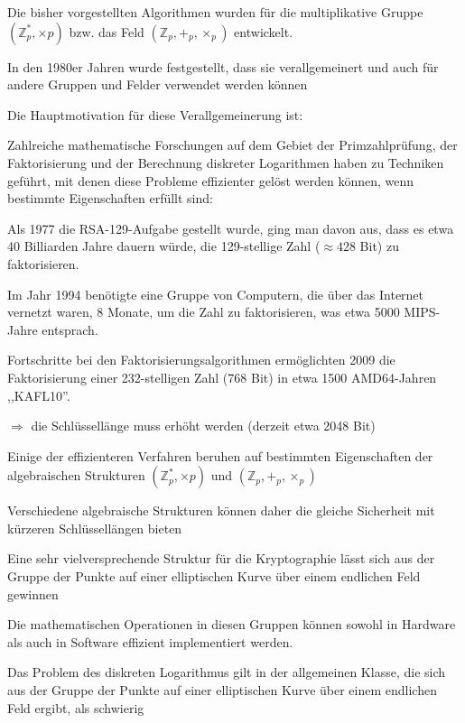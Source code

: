 \documentclass[a4paper]{article}
\begin{document}
\begin{multicols}{3}
      \begin{itemize*}
            \item Die bisher vorgestellten Algorithmen wurden für die multiplikative
            Gruppe $(\mathbb{Z}^*_p,\times p)$
            bzw. das Feld $(\mathbb{Z}_p, +_p,
                  \times_p)$ entwickelt.
            \item In den 1980er Jahren wurde festgestellt, dass sie verallgemeinert und
            auch für andere Gruppen und Felder verwendet werden können
            \item Die Hauptmotivation für diese Verallgemeinerung ist:
            \begin{itemize*}
                  \item Zahlreiche mathematische Forschungen auf dem Gebiet der Primzahlprüfung, der Faktorisierung und der Berechnung diskreter Logarithmen haben zu Techniken geführt, mit denen diese Probleme effizienter gelöst werden können, wenn bestimmte Eigenschaften erfüllt sind:
                  \begin{itemize*} \item Als 1977 die RSA-129-Aufgabe gestellt wurde, ging man davon aus, dass es etwa 40 Billiarden Jahre dauern würde, die 129-stellige Zahl ($\approx 428$ Bit) zu faktorisieren. \item Im Jahr 1994 benötigte eine Gruppe von Computern, die über das Internet vernetzt waren, 8 Monate, um die Zahl zu faktorisieren, was etwa 5000 MIPS-Jahre entsprach. \item Fortschritte bei den Faktorisierungsalgorithmen ermöglichten 2009 die Faktorisierung einer 232-stelligen Zahl (768 Bit) in etwa 1500 AMD64-Jahren ,,KAFL10''. \item $\Rightarrow$ die Schlüssellänge muss erhöht werden (derzeit etwa 2048 Bit) \end{itemize*}
                  \item Einige der effizienteren Verfahren beruhen auf bestimmten Eigenschaften der algebraischen Strukturen $(\mathbb{Z}^*_p,\times p)$ und $(\mathbb{Z}_p, +_p, \times_p)$
                  \item Verschiedene algebraische Strukturen können daher die gleiche Sicherheit mit kürzeren Schlüssellängen bieten
            \end{itemize*}
            \item Eine sehr vielversprechende Struktur für die Kryptographie lässt sich
            aus der Gruppe der Punkte auf einer elliptischen Kurve über einem
            endlichen Feld gewinnen
            \begin{itemize*}
                  \item Die mathematischen Operationen in diesen Gruppen können sowohl in Hardware als auch in Software effizient implementiert werden.
                  \item Das Problem des diskreten Logarithmus gilt in der allgemeinen Klasse, die sich aus der Gruppe der Punkte auf einer elliptischen Kurve über einem endlichen Feld ergibt, als schwierig
            \end{itemize*}
      \end{itemize*}



\end{multicols}
\end{document}
